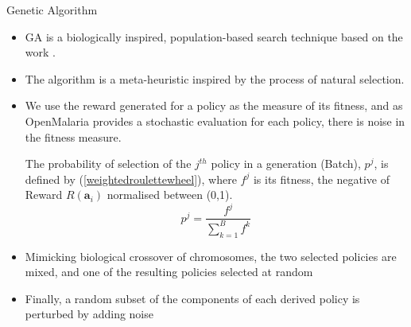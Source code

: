 \documentclass[10pt,usenames,dvipsnames]{beamer}
\begin{document}
\begin{frame}{Genetic Algorithm}

\begin{itemize}
\item  GA is a biologically inspired, population-based search technique based on the work \cite{Holland1992}.
\item The algorithm is a meta-heuristic inspired by the process of natural selection.
\item We use the reward generated for a policy as the measure of its fitness, and as OpenMalaria provides a stochastic evaluation for each policy, there is noise in the fitness measure.




The probability of selection of the $j^{th}$ policy in a generation (Batch), $p^j$, is defined by (\ref{weightedroulettewheel}), where $f^j$ is its fitness, the negative of Reward $R(\bm{a}_i)$ normalised between (0,1).
\begin{equation}
p^j = \frac{f^j}{\sum_{k=1}^{B} f^k}
\label{weightedroulettewheel}
\end{equation}


\item Mimicking biological crossover of chromosomes, the two selected policies are mixed, and one of the resulting policies selected at random
\item Finally, a random subset of the components of each derived policy is perturbed by adding noise
\end{itemize}

\end{frame}
\end{document}
